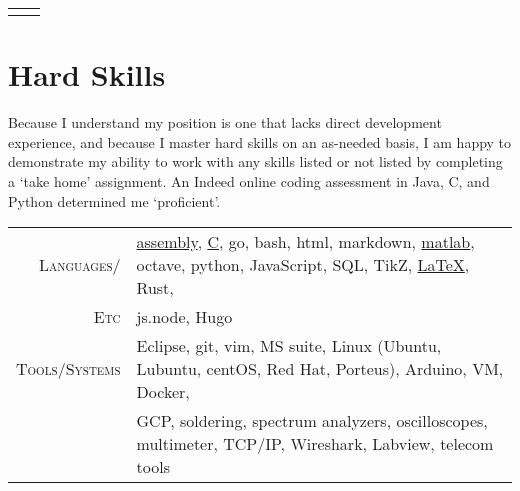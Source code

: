\documentclass[letter,11pt]{article}
\begin{document}
\begin{center}
{\begin{tabular}{r|l}
\addlinespace[12pt]

\end{tabular}
}

\vspace{-6pt}

\section{Hard Skills}
\vspace{-4pt}
\end{center}

\footnotesize{
\noindent Because I understand my position is one that lacks direct development experience, and because I master hard skills on an as-needed basis, I am happy to demonstrate my ability to work with any skills listed or not listed by completing a `take home' assignment. An Indeed online coding assessment in Java, C, and Python determined me `proficient'.\\

\vspace{-2pt}

\hspace{-28pt} %
\begin{tabular}{r|l}

		\textsc{Languages/}
	&	\scriptsize{\href{https://github.com/blairmunroakusa/portfolio.worksamples/blob/master/assembly/CSCE248_assignment4.asm}{assembly}, 
				\href{https://github.com/blairmunroakusa/portfolio.worksamples/tree/master/C}{C}, go, bash, html, markdown, 
				\href{https://github.com/blairmunroakusa/portfolio.worksamples/tree/master/cellularAutonoma}{matlab}, octave, python, JavaScript, SQL, TikZ, 					\href{https://github.com/blairmunroakusa/portfolio.worksamples/blob/master/resume/MunroBlair_resume112821.tex}{\LaTeX}, Rust,}
	\\
		\textsc{Etc}
	&	\scriptsize{js.node, Hugo}
	\\

\addlinespace[8pt]
	
		\textsc{Tools/Systems}
	&	\scriptsize{Eclipse, git, vim, MS suite, Linux (Ubuntu, Lubuntu, centOS, Red Hat, Porteus), Arduino, VM, Docker, } 
	\\
		
	&	\scriptsize{GCP, soldering, spectrum analyzers, oscilloscopes, multimeter, TCP/IP, Wireshark, Labview, telecom tools}
	\\
	
\end{tabular}

}
\end{document}
